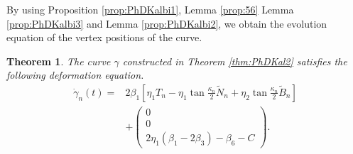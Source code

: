 \documentclass[10pt,leqno]{amsart}
\newtheorem{theorem}{Theorem}[section]
\numberwithin{equation}{section}
\begin{document}
By using Proposition \ref{prop:PhDKalbi1}, Lemma \ref{prop:56} Lemma \ref{prop:PhDKalbi3} and Lemma \ref{prop:PhDKalbi2}, we obtain the evolution equation of the vertex positions of the curve.
\begin{theorem}\label{thm:dotgamma}
The curve $\gamma$ constructed in Theorem \ref{thm:PhDKal2} satisfies the following deformation equation.
\begin{equation}\label{gdot501}
\begin{split}
\dot{\gamma}_{n}(t)=&2\beta_{1}\left[\eta_{1}T_{n}-\eta_{1}\tan\frac{\kappa_{n}}{2}\widetilde{N}_{n}+\eta_{2}\tan\frac{\kappa_{n}}{2}\widetilde{B}_{n}\right]\\
&+\left(
    \begin{array}{c}
0\\
0\\
2\eta_{1}\left(\beta_{1}-2\beta_{3}\right)-\beta_{6}-C
    \end{array}
  \right).
  \end{split}
\end{equation}
\end{theorem}
\end{document}
